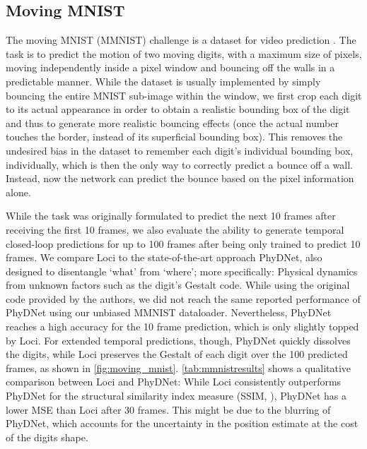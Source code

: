 \documentclass{article} \usepackage{iclr2023_conference_arxiv,times}
\begin{document}
\subsection{Moving MNIST}

The moving MNIST (MMNIST) challenge is a dataset for video prediction \cite{srivastava2015unsupervised}. The task is to predict the motion of two moving digits, with a maximum size of  pixels, moving independently inside a  pixel window and bouncing off the walls in a predictable manner. While the dataset is usually implemented by simply bouncing the entire  MNIST sub-image within the  window, we first crop each digit to its actual appearance in order to obtain a realistic bounding box of the digit and thus to generate more realistic bouncing effects (once the actual number touches the border, instead of its superficial bounding box). This removes the undesired bias in the dataset to remember each digit's individual bounding box, individually, which is then the only way to correctly predict a bounce off a wall. Instead, now the network can predict the bounce based on the pixel information alone.

While the task was originally formulated to predict the next 10 frames after receiving the first 10 frames, we also evaluate the ability to generate temporal closed-loop predictions for up to 100 frames after being only trained to predict 10 frames. 
We compare Loci to the state-of-the-art approach PhyDNet, also designed to disentangle `what' from `where'; more specifically: Physical dynamics from unknown factors such as the digit's Gestalt code. While using the original code provided by the authors, we did not reach the same reported performance of PhyDNet using our unbiased MMNIST dataloader.
Nevertheless, PhyDNet reaches a high accuracy for the 10 frame prediction, which is only slightly topped by Loci. For extended temporal predictions, though, PhyDNet quickly dissolves the digits, while Loci preserves the Gestalt of each digit over the 100 predicted frames, as shown in \autoref{fig:moving_mnist}.
\autoref{tab:mmnistresults} shows a qualitative comparison between Loci and PhyDNet: While Loci consistently outperforms PhyDNet for the structural similarity index measure (SSIM, \cite{wang2004image}), PhyDNet has a lower MSE than Loci after 30 frames. This might be due to the blurring of PhyDNet, which accounts for the uncertainty in the position estimate at the cost of the digits shape.


\newcommand{\alignedlabel}[2]{\parbox{#1}{\tiny\centering{\strut #2}}
}
\end{document}
